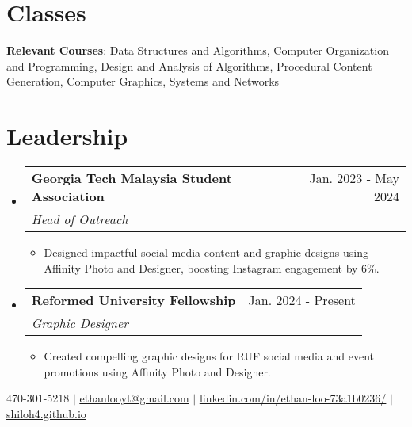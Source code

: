 \documentclass[letterpaper,11pt]{article}
\makeatletter
\newcommand{\resumeItem}[1]{
  \item\small{
    {#1 \vspace{-2pt}}
  }
}
\newcommand{\resumeSubheading}[4]{
  \vspace{-2pt}\item
    \begin{tabular*}{0.97\textwidth}[t]{l@{\extracolsep{\fill}}r}
      \textbf{#1} & #2 \\
      \textit{\small#3} & \textit{\small #4} \\
    \end{tabular*}\vspace{-7pt}
}
\newcommand{\resumeSubHeadingListStart}{\begin{itemize}[leftmargin=0.15in, label={}]}
\newcommand{\resumeSubHeadingListEnd}{\end{itemize}}
\newcommand{\resumeItemListStart}{\begin{itemize}}
\newcommand{\resumeItemListEnd}{\end{itemize}\vspace{-8pt}}
\makeatother
\begin{document}
\section{Classes}
\begin{itemize}[leftmargin=0.15in, label={}]
   \small{\item{
   \vspace{1mm}
    \textbf{Relevant Courses}{: Data Structures and Algorithms, Computer Organization and Programming, Design and Analysis of Algorithms, Procedural Content Generation, Computer Graphics, Systems and Networks} \\

   }}
\end{itemize}


\section{Leadership}
    \resumeSubHeadingListStart
      \resumeSubheading
      {Georgia Tech Malaysia Student Association}{Jan. 2023 - May 2024}
      {Head of Outreach}{}
      \resumeItemListStart
        \resumeItem{Designed impactful social media content and graphic designs using Affinity Photo and Designer, boosting Instagram engagement by 6\%.}
      \resumeItemListEnd
    \resumeSubHeadingListEnd

    \resumeSubHeadingListStart
      \resumeSubheading
      {Reformed University Fellowship}{Jan. 2024 - Present}
      {Graphic Designer}{}
      \resumeItemListStart
        \resumeItem{Created compelling graphic designs for RUF social media and event promotions using Affinity Photo and Designer.}
      \resumeItemListEnd
    \resumeSubHeadingListEnd

\begin{center}
\small 470-301-5218 $|$
\href{mailto:ethanlooyt@gmail.com}{\underline{ethanlooyt@gmail.com}} $|$
\href{https://www.linkedin.com/in/ethan-loo-73a1b0236/}{\underline{linkedin.com/in/ethan-loo-73a1b0236/}} $|$
\href{https://shiloh4.github.io/}{\underline{shiloh4.github.io}}
\end{center}
\end{document}
